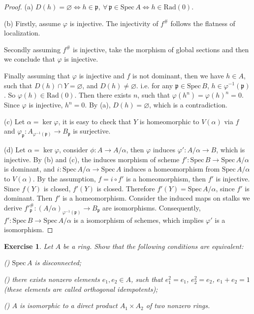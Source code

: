 \documentclass{amsart}
\newtheorem{exe}{Exercise}[subsection]
\theoremstyle{remark}\newtheorem{rmk}[theorem]{Remark}
\begin{document}
\begin{proof}
(a) $D(h)=\varnothing\iff h\in \mathfrak{p},\ \forall\, \mathfrak{p}\in \mathrm{Spec}\,A\iff h\in \mathrm{Rad}(0)$. 

(b) Firstly, assume $\varphi$ is injective. The injectivity of $f^\#$ follows the flatness of localization.

Secondly assuming $f^\#$ is injective, take the morphism of global sections and then we conclude that $\varphi$ is injective.

Finally assuming that $\varphi$ is injective and $f$ is not dominant, then we have $h\in A$, such that $D(h)\cap Y=\varnothing$, and $D(h)\neq\varnothing$. i.e. for any $\mathfrak{p}\in \mathrm{Spec}\,B$, $h\in\varphi^{-1}(\mathfrak{p})$.
So $\varphi(h)\in \mathrm{Rad}(0)$. Then there exists $n$, such that $\varphi(h^n)=\varphi(h)^n=0$. Since $\varphi$
is injective, $h^n=0$. By (a), $D(h)=\varnothing$, which is a contradiction.

(c) Let $\alpha=\ker\varphi$, it is easy to check that $Y$ is homeomorphic to $V(\alpha)$ via $f$ and
$\varphi_\mathfrak{p}: A_{\varphi^{-1}(\mathfrak{p})}\longrightarrow B_\mathfrak{p}$ is surjective.

(d) Let $\alpha=\ker\varphi$, consider $\phi:A\rightarrow A/\alpha$, then $\varphi$ induces $\varphi':A/\alpha \rightarrow B $,
which is injective. By (b) and (c), the induces morphism of scheme $f':\mathrm{Spec}\,B\rightarrow \mathrm{Spec}\,A/\alpha$ is dominant, and
$i:\mathrm{Spec}\,A/\alpha\rightarrow \mathrm{Spec}\,A$ induces a homeomorphism from $\mathrm{Spec}\,A/\alpha$ to $V(\alpha)$. By the assumption, $f=i\circ f'$ is
a homeomorphism, then $f'$ is injective. Since $f(Y)$ is closed, $f'(Y)$ is closed. Therefore $f'(Y)=\mathrm{Spec}\,A/\alpha$, since $f'$ is dominant.
Then $f'$ is a homeomorphism. Consider the induced maps on stalks we derive $f'^\#_\mathfrak{p}:(A/\alpha)_{\varphi^{-1}(\mathfrak{p})}\rightarrow B_\mathfrak{p}$ are isomorphisms.
Consequently, $f': \mathrm{Spec}\,B \rightarrow \mathrm{Spec}\,A/\alpha$ is a isomorphism of schemes, which implies $\varphi'$ is a isomorphism.
\end{proof}

\begin{exe}
Let $A$ be a ring. Show that the following conditions are equivalent:

\textup{()} $\mathrm{Spec}\,A$ is disconnected;

\textup{()} there exists nonzero elements $ e_1,e_2\in A$, such that $e_1^2=e_1$, $e_2^2=e_2$, $e_1+e_2=1$ (these elements are called \emph{orthogonal idempotents});

\textup{()} $A$ is isomorphic to a direct product $A_1\times A_2$ of two nonzero rings.
\end{exe}
\end{document}
